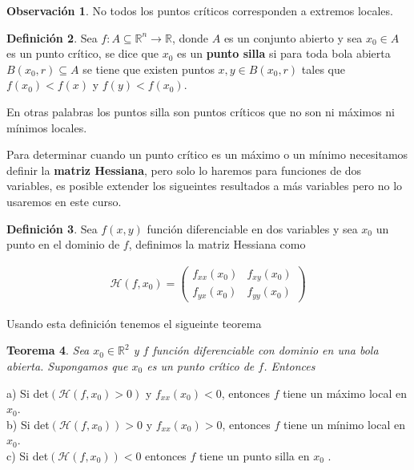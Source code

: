 \documentclass{article}
\theoremstyle{plain}
\newtheorem{thm}{Teorema}[section]
\theoremstyle{definition}
\newtheorem{defin}[thm]{Definición}
\newtheorem{rmk}[thm]{Observación}
\begin{document}
\begin{rmk}No todos los puntos críticos corresponden a extremos locales.\\
\end{rmk}

\begin{defin}Sea $f: A \subseteq \mathbb{R}^n \to \mathbb{R}$, donde $A$ es un conjunto abierto y sea $x_0 \in A$ es un punto crítico, se dice que $x_0$ es un \textbf{punto silla} si para toda bola abierta $B(x_0,r) \subseteq A$ se tiene que existen puntos $x,y \in B(x_0,r)$ tales que $f(x_0) < f(x)$ y $f(y) < f(x_0)$. \\
\end{defin}

En otras palabras los puntos silla son puntos críticos que no son ni máximos ni mínimos locales. \\

\newpage

Para determinar cuando un punto crítico es un máximo o un mínimo necesitamos definir la \textbf{matriz Hessiana}, pero solo lo haremos para funciones de dos variables, es posible extender los sigueintes resultados a más variables pero no lo usaremos en este curso. \\

\begin{defin}Sea $f(x,y)$ función diferenciable en dos variables y sea $x_0$ un punto en el dominio de $f$, definimos la matriz Hessiana como
\end{defin}

\begin{align*}
    \mathcal{H}(f,x_0) = \begin{pmatrix}
        f_{xx}(x_0) & f_{xy}(x_0) \\
        f_{yx}(x_0) & f_{yy}(x_0)
    \end{pmatrix}
\end{align*}


Usando esta definición tenemos el sigueinte teorema



\begin{thm}Sea $x_0 \in \mathbb{R}^2$ y $f$ función diferenciable con dominio en una bola abierta. Supongamos que $x_0$ es un punto crítico de $f$. Entonces \\
\end{thm}

a) Si det$(\mathcal{H}(f,x_0)>0)$ y $f_{xx}(x_0)<0$, entonces $f$ tiene un máximo local en $x_0$. \\
b) Si det$(\mathcal{H}(f,x_0))>0$ y $f_{xx}(x_0)>0$, entonces $f$ tiene un mínimo local en $x_0$. \\
c) Si det$(\mathcal{H}(f,x_0))<0$ entonces $f$ tiene un punto silla en $x_0$ . \\
\end{document}
